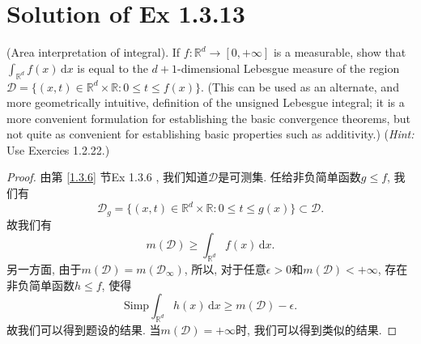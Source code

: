 \documentclass[reqno,a4paper,10pt]{amsart}
\newcommand\dif{\,\mathrm{d}}
\newcommand\Rnum{\mathbb{R}}
\begin{document}
\section{Solution of Ex 1.3.13}
(Area interpretation of integral). If $f:\Rnum^d\to[0,+\infty]$ is a measurable, show that $\int_{\Rnum^d} f(x)\dif x$ is equal to the $d+1$-dimensional Lebesgue measure of the region $\mathcal{D}=\{(x,t)\in\Rnum^d\times \Rnum:0\leq t\leq f(x)\}$. (This can be used as an alternate, and more geometrically intuitive, definition of the unsigned Lebesgue integral; it is a more convenient formulation for establishing the basic convergence theorems, but not quite as convenient for establishing basic properties such as additivity.) (\textit{Hint:} Use Exercies 1.2.22.)
\begin{proof}
	由第 \ref{1.3.6} 节Ex 1.3.6 , 我们知道$\mathcal{D}$是可测集. 任给非负简单函数$g\leq f$, 我们有
	\begin{equation*}
		\mathcal{D}_g=\{(x,t)\in\Rnum^d\times \Rnum:0\leq t\leq g(x)\}\subset \mathcal{D}.
	\end{equation*}
	故我们有
	\begin{equation*}
		m(\mathcal{D})\geq \int_{\Rnum^d} f(x)\dif x.
	\end{equation*}
	另一方面, 由于$m(\mathcal{D})=m(\mathcal{D}_\infty)$, 所以, 对于任意$\epsilon>0$和$m(\mathcal{D})<+\infty$, 存在非负简单函数$h\leq f$, 使得
	\begin{equation*}
		\mathrm{Simp}\int_{\Rnum^d} h(x)\dif x\geq m(\mathcal{D})-\epsilon.
	\end{equation*}
	故我们可以得到题设的结果. 当$m(\mathcal{D})=+\infty$时, 我们可以得到类似的结果. 
\end{proof}
\end{document}
